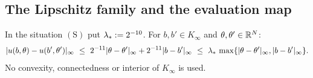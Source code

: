 \subsection{The Lipschitz family and the evaluation map}\label{bpP:p11a:sec-lip}

\begin{proposition}\label{bpP:p11a:lipschitz-family}
In the situation $(\mathrm S)$ put $\lambda_{*}:=2^{-10}$. For $b,b'\in K_\infty$ and $\theta,\theta'\in\mathbb{R}^N$:
\[\lvert u(b,\theta)-u(b',\theta')\rvert_\infty\ \le\ 2^{-11}\lvert\theta-\theta'\rvert_\infty+2^{-11}\lvert b-b'\rvert_\infty\ \le\ \lamstar\,\max\{\lvert\theta-\theta'\rvert_\infty,\lvert b-b'\rvert_\infty\}.\]
No convexity, connectedness or interior of $K_\infty$ is used.
\end{proposition}
